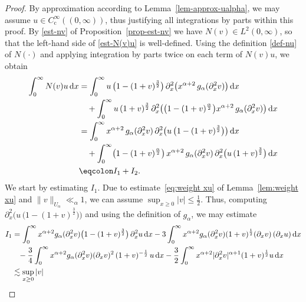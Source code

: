 \documentclass[reqno,12pt]{amsart}
\renewcommand{\d}{\ensuremath{\mathrm{d}}}
\renewcommand{\d}{\ensuremath{{\rm d}}}
\numberwithin{equation}{section}
\begin{document}
\begin{proof}
By approximation according to Lemma~\ref{lem-approx-ualpha}, we may assume $u \in C^\infty_\mathrm{c}((0,\infty))$, thus justifying all integrations by parts within this proof. By \eqref{est-nv} of Proposition~\ref{prop-est-nv} we have $N(v) \in L^2(0,\infty)$, so that the left-hand side of \eqref{est-N(v)u} is well-defined. Using the definition \eqref{def-nu} of $N(\cdot)$ and applying integration by parts twice on each term of $N(v)u$, we obtain
%
\begin{align}\nonumber
    \int_0^{\infty} N(v) u\, \d x 
    &= 
    \int_0^{\infty} u\, \bigl(1-(1+v)^{\frac{3}{2}}\bigr) \, \partial^2_x\bigl(x^{\alpha+2}\, g_{\alpha}(\partial_x^2 v)\bigr) \, \d x 
    \\
    & \quad 
    + \int_0^{\infty} u\,  (1+v)^{\frac{3}{2}} \, \partial^2_x\bigl(
    \bigl(1-(1+v)^{\frac{\alpha}{2}}\bigr) x^{\alpha+2}\, g_{\alpha}(\partial_x^2 v)\bigr) \, \d x 
    \nonumber\\
    &= 
    \int_0^{\infty} x^{\alpha+2}\, g_{\alpha}(\partial_x^2 v)\, 
    \partial^2_x\bigl(u\, \bigl(1-(1+v)^{\frac{3}{2}}\bigr)\bigr) \, \d x 
    \nonumber\\
    &\quad 
    + \int_0^{\infty} \bigl(1-(1+v)^{\frac{\alpha}{2}}\bigr) \, x^{\alpha+2}\, g_{\alpha}(\partial_x^2 v)\, \partial^2_x\bigl(u\,  (1+v)^{\frac{3}{2}}\bigr) \,\d x
    \nonumber\\
    &\eqcolon
    I_1 + I_2. \label{eq:estimate1RHS}
\end{align}
%
We start by estimating $I_1$. Due to estimate~\eqref{eq:weight xu} of Lemma~\ref{lem:weight xu} and $\|v\|_{U_\alpha} \ll_\alpha 1$, we can assume $\sup_{x\geq 0} |v| \le \frac 1 2$. Thus, computing $\partial^2_x\bigl(u\, \bigl(1-(1+v)^{\frac{3}{2}}\bigr)\bigr)$ and using the definition of $g_\alpha$, we may estimate 
%
\begin{align}\nonumber
    I_1
    &=
    \int_0^\infty x^{\alpha+2} g_\alpha(\partial_x^2 v)  \bigl(1 - (1 + v)^\frac{3}{2}\bigr)\, \partial_x^2u\, \d x 
    - 
    3 \int_0^\infty x^{\alpha+2} g_\alpha(\partial_x^2 v) (1 + v)^\frac{1}{2} (\partial_x v)\, (\partial_x u)\, \d x
    \\
    & \phantom{=}
    - \frac{3}{4} \int_0^\infty x^{\alpha+2} g_\alpha(\partial_x^2 v) (\partial_x v)^2\, (1 + v)^{-\frac{1}{2}}\, u\,  \d x
    -
    \frac{3}{2} \int_0^\infty x^{\alpha+2} |\partial_x^2 v|^{\alpha+1} (1 + v)^\frac{1}{2} u\, \d x
    \nonumber\\
    & \lesssim
    \sup_{x\geq 0} |v|

\end{align}
\end{proof}
\end{document}
